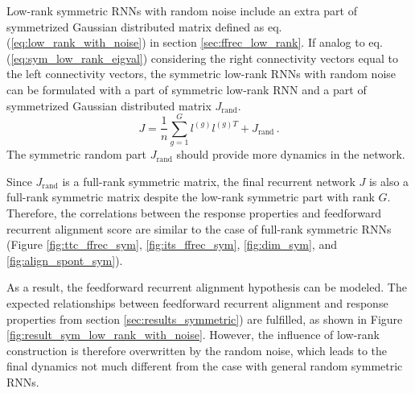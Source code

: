 \documentclass[11pt]{article}
\begin{document}
	
	Low-rank symmetric RNNs with random noise include an extra part of symmetrized Gaussian distributed matrix defined as  eq.(\ref{eq:low_rank_with_noise}) in section \ref{sec:ffrec_low_rank}. If analog to eq.(\ref{eq:sym_low_rank_eigval}) considering the right connectivity vectors equal to the left connectivity vectors, the symmetric low-rank RNNs with random noise can be formulated with a part of symmetric low-rank RNN and a part of symmetrized Gaussian distributed matrix $J_{\text{rand}}$. 
	\begin{equation} \label{eq:low_rank_sym_with_noise}
		J = \frac{1}{n}\sum_{g =1}^{G} l^{(g)} l^{(g)T} + J_{\text{rand}} \, .
	\end{equation}
	The symmetric random part $J_{\text{rand}}$ should provide more dynamics in the network. 
	
	Since $J_{\text{rand}}$ is a full-rank symmetric matrix, the final recurrent network $J$ is also a full-rank symmetric matrix despite the low-rank symmetric part with rank $G$. Therefore, the correlations between the response properties and feedforward recurrent alignment score are similar to the case of full-rank symmetric RNNs (Figure \ref{fig:ttc_ffrec_sym}, \ref{fig:its_ffrec_sym}, \ref{fig:dim_sym}, and \ref{fig:align_spont_sym}). 
	
	As a result, the feedforward recurrent alignment hypothesis can be modeled. The expected relationships between feedforward recurrent alignment and response properties from section \ref{sec:results_symmetric}) are fulfilled, as shown in Figure \ref{fig:result_sym_low_rank_with_noise}. However, the influence of low-rank construction is therefore overwritten by the random noise, which leads to the final dynamics not much different from the case with general random symmetric RNNs. 
	
\end{document}
